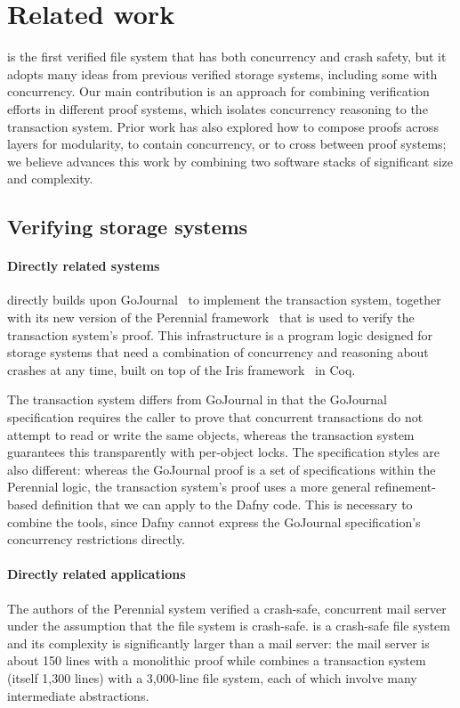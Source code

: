 \section{Related work}

\sys is the first verified file system that has both concurrency and crash
safety, but it adopts many ideas from previous verified storage systems,
including some with concurrency. Our main contribution is an approach for
combining verification efforts in different proof systems, which isolates
concurrency reasoning to the transaction system. Prior work has also explored
how to compose proofs across layers for modularity, to contain concurrency, or
to cross between proof systems; we believe \sys advances this work by combining
two software stacks of significant size and complexity.

\subsection{Verifying storage systems}

\paragraph{Directly related systems} \sys directly builds upon
GoJournal~\cite{chajed:gojournal} to implement the transaction system, together
with its new version of the Perennial framework~\cite{chajed:perennial} that is
used to verify the transaction system's proof. This infrastructure is a program
logic designed for storage systems that need a combination of concurrency and
reasoning about crashes at any time, built on top of the Iris
framework~\cite{jung:iris-1} in Coq.

The transaction system differs from GoJournal in that the GoJournal
specification requires the caller to prove that concurrent transactions do not
attempt to read or write the same objects, whereas the transaction system
guarantees this transparently with per-object locks. The specification styles
are also different: whereas the GoJournal proof is a set of specifications
within the Perennial logic, the transaction system's proof uses a more general
refinement-based definition that we can apply to the Dafny code. This is
necessary to combine the tools, since Dafny cannot express the GoJournal
specification's concurrency restrictions directly.

\paragraph{Directly related applications}  The authors of the
Perennial system verified a crash-safe, concurrent mail server under
the assumption that the file system is crash-safe. \sys is a
crash-safe file system and its complexity is significantly larger than
a mail server: the mail server is about 150 lines with a monolithic
proof while \sys combines a transaction system (itself 1,300 lines) with
a 3,000-line file system, each of which involve many intermediate
abstractions.

